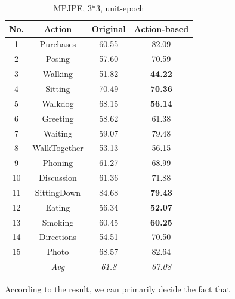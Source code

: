 \documentclass[10pt,twocolumn,letterpaper]{article}
\begin{document}
\begin{table}[H]
\caption{MPJPE, 3*3, unit-epoch}

\begin{center}

\begin{tabular}{cccc}

\hline
No. & Action & Original & Action-based \\
\hline

1&Purchases& 60.55 & 82.09 \\
2&Posing& 57.60 & 70.59\\
3&Walking& 51.82 & \textbf{44.22} \\
4&Sitting& 70.49 & \textbf{70.36} \\
5&Walkdog& 68.15 & \textbf{56.14} \\
6&Greeting& 58.62 & 61.38\\
7&Waiting& 59.07 & 79.48\\
8&WalkTogether& 53.13 & 56.15\\
9&Phoning& 61.27 & 68.99 \\
10&Discussion& 61.36 & 71.88 \\
11&SittingDown& 84.68 & \textbf{79.43}\\
12&Eating&  56.34 & \textbf{52.07} \\
13&Smoking& 60.45 & \textbf{60.25}\\
14&Directions& 54.51 & 70.50 \\
15&Photo& 68.57 & 82.64\\
&\textit{Avg}& \textit{61.8} & \textit{67.08}\\


\hline
\end{tabular}

\end{center}

\end{table}

According to the result, we can primarily decide the fact that 
\end{document}
